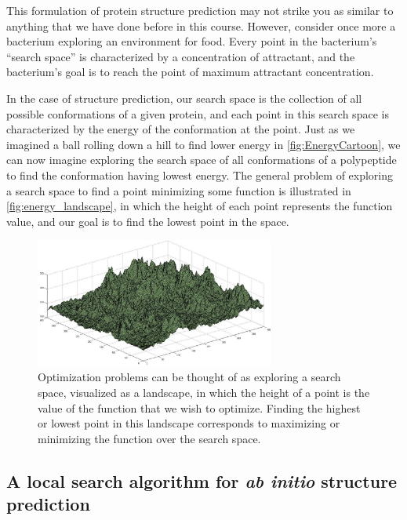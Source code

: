 This formulation of protein structure prediction may not strike you as similar to anything that we have done before in this course. However, consider once more a bacterium exploring an environment for food. Every point in the bacterium's ``search space'' is characterized by a concentration of attractant, and the bacterium's goal is to reach the point of maximum attractant concentration.

In the case of structure prediction, our search space is the collection of all possible conformations of a given protein, and each point in this search space is characterized by the energy of the conformation at the point. Just as we imagined a ball rolling down a hill to find lower energy in \autoref{fig:EnergyCartoon}, we can now imagine exploring the search space of all conformations of a polypeptide to find the conformation having lowest energy. The general problem of exploring a search space to find a point minimizing some function is illustrated in \autoref{fig:energy_landscape}, in which the height of each point represents the function value, and our goal is to find the lowest point in the space.\\

\begin{figure}[h]
	\centering
	\mySfFamily
	\includegraphics[width = 0.7\textwidth]{../images/energy_landscape.png}
	\caption{Optimization problems can be thought of as exploring a search space, visualized as a landscape, in which the height of a point is the value of the function that we wish to optimize. Finding the highest or lowest point in this landscape corresponds to maximizing or minimizing the function over the search space.}
	\label{fig:energy_landscape}
\end{figure}

\FloatBarrier
{}
\subsection{A local search algorithm for \textit{ab initio} structure prediction}

